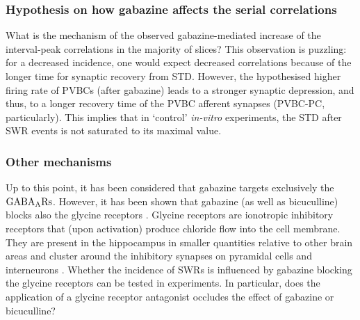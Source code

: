     \subsubsection{Hypothesis on how gabazine affects the serial correlations}
    What is the mechanism of the observed gabazine-mediated increase of the
    interval-peak correlations in the majority of slices? This observation is
    puzzling: for a decreased incidence, one would expect decreased
    correlations because of the longer time for synaptic recovery from STD.
    However, the hypothesised higher firing rate of PVBCs (after gabazine)
    leads to a stronger synaptic depression, and thus, to a longer recovery
    time of the PVBC afferent synapses (PVBC-PC, particularly). This implies
    that in `control' \textit{in-vitro} experiments, the STD after SWR events
    is not saturated to its maximal value.
      

    \subsubsection{Other mechanisms} 
      Up to this point, it has been considered that gabazine targets
      exclusively the $\rm GABA_ARs$. However, it has been shown that gabazine
      (as well as bicuculline) blocks also the glycine receptors
      \citep{Wang2005, Li2007}. Glycine receptors are ionotropic inhibitory
      receptors that (upon activation) produce chloride flow into the cell
      membrane. They are present in the hippocampus in smaller quantities
      relative to other brain areas \citep{denPol1988} and cluster around the
      inhibitory synapses on pyramidal cells and interneurons \citep{Levi2004}.
      Whether the incidence of SWRs is influenced by gabazine blocking the
      glycine receptors can be tested in experiments. In particular, does the
      application of a glycine receptor antagonist occludes the effect of
      gabazine or bicuculline?

